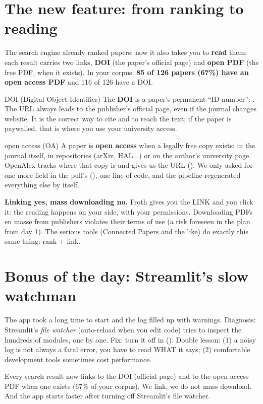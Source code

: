 \documentclass[11pt,a4paper]{article}
\begin{document}

\section{The new feature: from ranking to reading}

The search engine already ranked papers; now it also takes you to \textbf{read} them: each
result carries two links, \textbf{DOI} (the paper's official page) and \textbf{open PDF} (the
free PDF, when it exists). In your corpus: \textbf{85 of 126 papers (67\%) have an open access
PDF} and 116 of 126 have a DOI.

\begin{concepto}{DOI (Digital Object Identifier)}
The \textbf{DOI} is a paper's permanent ``ID number'': . The URL
 always leads to the publisher's official page, even if the
journal changes website. It is the correct way to cite and to reach the text; if the paper is
paywalled, that is where you use your university access.
\end{concepto}

\begin{concepto}{open access (OA)}
A paper is \textbf{open access} when a legally free copy exists: in the journal itself, in
repositories (arXiv, HAL...) or on the author's university page. OpenAlex tracks where that
copy is and gives us the URL (). We only asked for one more field in the
pull's  (), one line of code, and the pipeline regenerated
everything else by itself.
\end{concepto}

\begin{ojo}
\textbf{Linking yes, mass downloading no.} Froth gives you the LINK and you click it: the
reading happens on your side, with your permissions. Downloading PDFs en masse from publishers
violates their terms of use (a risk foreseen in the plan from day 1). The serious tools
(Connected Papers and the like) do exactly this same thing: rank $+$ link.
\end{ojo}

\section{Bonus of the day: Streamlit's slow watchman}

The app took a long time to start and the log filled up with  warnings.
Diagnosis: Streamlit's \emph{file watcher} (auto-reload when you edit code) tries to inspect
the hundreds of  modules, one by one. Fix: turn it off in
 (). Double lesson: (1) a noisy
log is not always a fatal error, you have to read WHAT it says; (2) comfortable development
tools sometimes cost performance.

\begin{resumen}
Every search result now links to the DOI (official page) and to the open access PDF when one
exists (67\% of your corpus). We link, we do not mass download. And the app starts faster after
turning off Streamlit's file watcher.
\end{resumen}
\end{document}
